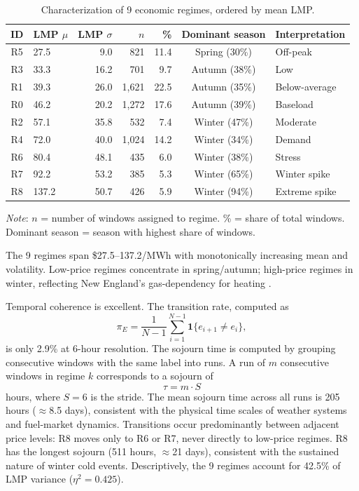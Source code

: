 \documentclass[12pt]{article}
\begin{document}
\begin{table}[H]
\centering
\caption{Characterization of 9 economic regimes, ordered by mean LMP.}
\label{tab:regimes}
\small
\setlength{\tabcolsep}{4pt}
\begin{tabular}{clrrrcl}
\toprule
ID & LMP $\mu$ & LMP $\sigma$ & $n$ & \% & Dominant season & Interpretation \\
\midrule
R5 & 27.5  & 9.0  & 821  & 11.4 & Spring (30\%)    & Off-peak \\
R3 & 33.3  & 16.2 & 701  & 9.7  & Autumn (38\%)    & Low \\
R1 & 39.3  & 26.0 & 1,621 & 22.5 & Autumn (35\%)   & Below-average \\
R0 & 46.2  & 20.2 & 1,272 & 17.6 & Autumn (39\%)   & Baseload \\
R2 & 57.1  & 35.8 & 532  & 7.4  & Winter (47\%)    & Moderate \\
R4 & 72.0  & 40.0 & 1,024 & 14.2 & Winter (34\%)   & Demand \\
R6 & 80.4  & 48.1 & 435  & 6.0  & Winter (38\%)    & Stress \\
R7 & 92.2  & 53.2 & 385  & 5.3  & Winter (65\%)    & Winter spike \\
R8 & 137.2 & 50.7 & 426  & 5.9  & Winter (94\%)    & Extreme spike \\
\bottomrule
\end{tabular}

\medskip
\small
\textit{Note}: $n$ = number of windows assigned to regime. \% = share of total windows. Dominant season = season with highest share of windows.
\end{table}

The 9 regimes span \$27.5--137.2/MWh with monotonically increasing mean and volatility.
Low-price regimes concentrate in spring/autumn; high-price regimes in winter, reflecting New England's gas-dependency for heating \citep{isone2024}.

Temporal coherence is excellent.
The transition rate, computed as
\begin{equation}
\pi_E =
\frac{1}{N-1}
\sum_{i=1}^{N-1}
\mathbf{1}\{e_{i+1}\neq e_i\},
\label{eq:transition_rate}
\end{equation}
is only 2.9\% at 6-hour resolution.
The sojourn time is computed by grouping consecutive windows with the same label into runs.
A run of $m$ consecutive windows in regime $k$ corresponds to a sojourn of
\begin{equation}
\tau = m \cdot S
\label{eq:sojourn}
\end{equation}
hours, where $S=6$ is the stride.
The mean sojourn time across all runs is 205 hours ($\approx$8.5 days), consistent with the physical time scales of weather systems and fuel-market dynamics.
Transitions occur predominantly between adjacent price levels: R8 moves only to R6 or R7, never directly to low-price regimes.
R8 has the longest sojourn (511 hours, $\approx$21 days), consistent with the sustained nature of winter cold events.
Descriptively, the 9 regimes account for 42.5\% of LMP variance ($\eta^2 = 0.425$).
\end{document}
